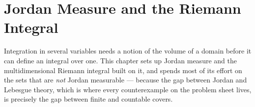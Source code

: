 \chapter{Jordan Measure and the Riemann Integral}
\label{ch:jordan_measure}

Integration in several variables needs a notion of the volume of a domain before it can define an
integral over one. This chapter sets up Jordan measure and the multidimensional Riemann integral
built on it, and spends most of its effort on the sets that are \emph{not} Jordan measurable ---
because the gap between Jordan and Lebesgue theory, which is where every counterexample on the
problem sheet lives, is precisely the gap between finite and countable covers.



